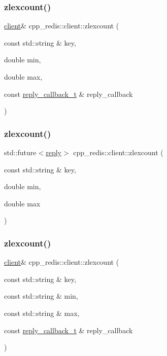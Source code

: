 \subsubsection{\texorpdfstring{zlexcount()}{zlexcount()}\hspace{0.1cm}{\footnotesize\ttfamily [3/6]}}
{\footnotesize\ttfamily \hyperlink{classcpp__redis_1_1client}{client}\& cpp\+\_\+redis\+::client\+::zlexcount (\begin{DoxyParamCaption}\item[{const std\+::string \&}]{key,  }\item[{double}]{min,  }\item[{double}]{max,  }\item[{const \hyperlink{classcpp__redis_1_1client_a061a1140d36d2eaeda82b09a0bb3f9f2}{reply\+\_\+callback\+\_\+t} \&}]{reply\+\_\+callback }\end{DoxyParamCaption})}

\mbox{\label{classcpp__redis_1_1client_ab492b901c49f913d0120b87afee9458c}} 
\subsubsection{\texorpdfstring{zlexcount()}{zlexcount()}\hspace{0.1cm}{\footnotesize\ttfamily [4/6]}}
{\footnotesize\ttfamily std\+::future$<$\hyperlink{classcpp__redis_1_1reply}{reply}$>$ cpp\+\_\+redis\+::client\+::zlexcount (\begin{DoxyParamCaption}\item[{const std\+::string \&}]{key,  }\item[{double}]{min,  }\item[{double}]{max }\end{DoxyParamCaption})}

\mbox{\label{classcpp__redis_1_1client_a90bd86c8348ca8bfec29d66d9e5bdfc3}} 
\subsubsection{\texorpdfstring{zlexcount()}{zlexcount()}\hspace{0.1cm}{\footnotesize\ttfamily [5/6]}}
{\footnotesize\ttfamily \hyperlink{classcpp__redis_1_1client}{client}\& cpp\+\_\+redis\+::client\+::zlexcount (\begin{DoxyParamCaption}\item[{const std\+::string \&}]{key,  }\item[{const std\+::string \&}]{min,  }\item[{const std\+::string \&}]{max,  }\item[{const \hyperlink{classcpp__redis_1_1client_a061a1140d36d2eaeda82b09a0bb3f9f2}{reply\+\_\+callback\+\_\+t} \&}]{reply\+\_\+callback }\end{DoxyParamCaption})}

